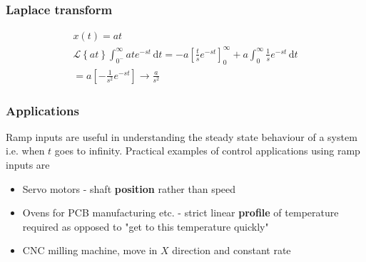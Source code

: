 \documentclass[class=report, crop=false, 12pt,a4paper, tikz, border=4mm]{standalone}
\begin{document}
\subsubsection{Laplace transform}
\begin{gather}
  x(t) = at\\
  \mathcal{L} \left\{ at \right\} \int_{0^-}^{\infty} ate^{-st} \,\mathrm{d}t = -a \left[ \frac{t}{s}e^{-st} \right]_{0}^{\infty} + a\int_{0}^{\infty} \frac{1}{s} e^{-st} \,\mathrm{d}t\\
  = a \left[ -\frac{1}{s^2}e^{-st} \right] \rightarrow \frac{a}{s^2}   
\end{gather}
\subsubsection{Applications}
Ramp inputs are useful in understanding the steady state behaviour of a system i.e. when $t$ goes to infinity. Practical examples of control applications using ramp inputs are
\begin{itemize}
  \item Servo motors - shaft \textbf{position} rather than speed
  \item Ovens for PCB manufacturing etc. - strict linear \textbf{profile} of temperature required as opposed to "get to this temperature quickly"
  \item CNC milling machine, move in $X$ direction and constant rate
\end{itemize}
\end{document}
